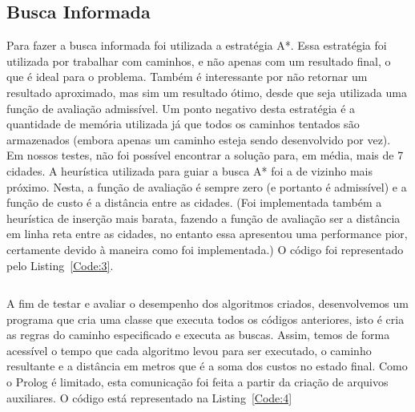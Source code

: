 \documentclass[12pt,a4paper]{article}
\begin{document}
\subsection{Busca Informada}
Para fazer a busca informada foi utilizada a estratégia A*. Essa estratégia foi utilizada por trabalhar com caminhos, e não apenas com um resultado final, o que é ideal para o problema. Também é interessante por não retornar um resultado aproximado, mas sim um resultado ótimo, desde que seja utilizada uma função de avaliação admissível. 
	Um ponto negativo desta estratégia é a quantidade de memória utilizada já que todos os caminhos tentados são armazenados (embora apenas um caminho esteja sendo desenvolvido por vez). Em nossos testes, não foi possível encontrar a solução para, em média, mais de 7 cidades.
  A heurística utilizada para guiar a busca A* foi a de vizinho mais próximo. Nesta, a função de avaliação é sempre zero (e portanto é admissível) e a função de custo é a distância entre as cidades. (Foi implementada também a heurística de inserção mais barata, fazendo a função de avaliação ser a distância em linha reta entre as cidades, no entanto essa apresentou uma performance pior, certamente devido à maneira como foi implementada.)
  O código foi representado pelo Listing~\ref{Code:3}.

  \begin{mdframed}[linecolor=black, topline=true, bottomline=true,
  leftline=false, rightline=false, backgroundcolor=yellow!10!white]
\inputminted[tabsize=2,linenos=true,fontsize=\footnotesize,breaklines=true,breakafter=format]{prolog}{../buscaInformada_A.pl}
\end{mdframed}
  \label{Code:3}

A fim de testar e avaliar o desempenho dos algoritmos criados, desenvolvemos um programa que cria uma classe que executa todos os códigos anteriores, isto é cria as regras do caminho especificado e executa as buscas. Assim, temos de forma acessível o tempo que cada algoritmo levou para ser executado, o caminho resultante e a distância em metros que é a soma dos custos no estado final. Como o Prolog é limitado, esta comunicação foi feita a partir da criação de arquivos auxiliares. O código está representado na Listing~\ref{Code:4}

  \begin{mdframed}[linecolor=black, topline=true, bottomline=true,leftline=false, rightline=false, backgroundcolor=yellow!10!white]
\inputminted[tabsize=2,linenos=true,fontsize=\footnotesize,breaklines=true,breakafter=format]{python}{../PrologIO.py}
\end{mdframed}
  \label{Code:4}
\end{document}
